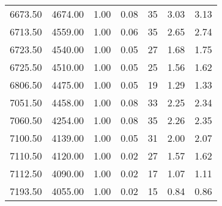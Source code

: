 \begin{table}
\begin{tabular}{rrrrrrr}
6673.50 & 4674.00 & 1.00 & 0.08 & 35 & 3.03 & 3.13 \\
6713.50 & 4559.00 & 1.00 & 0.06 & 35 & 2.65 & 2.74 \\
6723.50 & 4540.00 & 1.00 & 0.05 & 27 & 1.68 & 1.75 \\
6725.50 & 4510.00 & 1.00 & 0.05 & 25 & 1.56 & 1.62 \\
6806.50 & 4475.00 & 1.00 & 0.05 & 19 & 1.29 & 1.33 \\
7051.50 & 4458.00 & 1.00 & 0.08 & 33 & 2.25 & 2.34 \\
7060.50 & 4254.00 & 1.00 & 0.08 & 35 & 2.26 & 2.35 \\
7100.50 & 4139.00 & 1.00 & 0.05 & 31 & 2.00 & 2.07 \\
7110.50 & 4120.00 & 1.00 & 0.02 & 27 & 1.57 & 1.62 \\
7112.50 & 4090.00 & 1.00 & 0.02 & 17 & 1.07 & 1.11 \\
7193.50 & 4055.00 & 1.00 & 0.02 & 15 & 0.84 & 0.86 \\
\bottomrule
\end{tabular}
\end{table}
